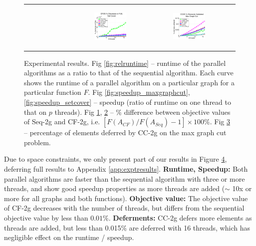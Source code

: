 \documentclass{article} %
\newcommand{\hogwild}{CF-2g}
\newcommand{\occ}{CC-2g}
\newcommand{\seqalg}{Seq-2g}
\newcommand{\hogwildshort}{CF}
\newcommand{\seqalgshort}{Seq}
\begin{document}
\begin{figure}[ht]
\begin{tabular}{cccc}
\begin{subfigure}[h]{0.30\textwidth}
			\caption{}
			\label{fig:difffa_maxgraphcut}
	  \end{subfigure} &
	  \begin{subfigure}[h]{0.30\textwidth}
	  	\includegraphics[width=130pt]{images/summary_diffFA_setcover.pdf}
			\caption{}
			\label{fig:difffa_setcover}
	  \end{subfigure} &
	  \begin{subfigure}[h]{0.30\textwidth}
	  	\includegraphics[width=130pt]{images/summary_validated_maxgraphcut.pdf}
			\caption{}
			\label{fig:validated_maxgraphcut}
	  \end{subfigure} \\
  \end{tabular}
  \caption{\footnotesize Experimental results.
  Fig \ref{fig:relruntime} -- runtime of the parallel algorithms as a ratio to that of the sequential algorithm. Each curve shows the runtime of a parallel algorithm on a particular graph for a particular function $F$.
  Fig \ref{fig:speedup_maxgraphcut}, \ref{fig:speedup_setcover} -- speedup (ratio of runtime on one thread to that on $p$ threads).
  Fig \ref{fig:difffa_maxgraphcut}, \ref{fig:difffa_setcover} -- \% difference between objective values of \seqalg{} and \hogwild{}, i.e. $[F(A_{\hogwildshort{}}) / F(A_{\seqalgshort{}}) - 1] \times 100\%$.
  Fig \ref{fig:validated_maxgraphcut} -- percentage of elements deferred by \occ{} on the max graph cut problem.
  }
\label{fig:results_quality}
\end{figure}


Due to space constraints, we only present part of our results in Figure \ref{fig:results_quality}, deferring full results to Appendix \ref{app:exptresults}.
\textbf{Runtime, Speedup:} Both parallel algorithms are faster than the sequential algorithm with three or more threads, and show good speedup properties as more threads are added ($\sim$ 10x or more for all graphs and both functions).
\textbf{Objective value:} The objective value of \hogwild{} decreases with the number of threads, but differs from the sequential objective value by less than $0.01\%$.
\textbf{Deferments:} \occ{} defers more elements as threads are added, but less than 0.015\% are deferred with 16 threads, which has negligible effect on the runtime / speedup.
\end{document}
